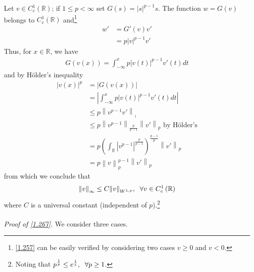\documentclass[a4paper,oneside]{book}
\numberwithin{equation}{chapter}
\begin{document}
Let $v\in C_c^1\left(\mathbb{R}\right)$; if $1\le p <\infty$ set $G\left( s \right) = {\left| s \right|^{p - 1}}s$. The function $w=G\left(v\right)$ belongs to $C_c^1\left(\mathbb{R}\right)$ and\footnote{\eqref{1.257} can be easily verified by considering two cases $v\ge 0$ and $v <0$.}
\begin{align}
w' &= G'\left( v \right)v'\\
 &= p{\left| v \right|^{p - 1}}v' \label{1.257}
\end{align}
Thus, for $x\in \mathbb{R}$, we have
\begin{align}
G\left( {v\left( x \right)} \right) = \int_{ - \infty }^x {p{{\left| {v\left( t \right)} \right|}^{p - 1}}v'\left( t \right)dt} 
\end{align}
and by H\"{o}lder's inequality
\begin{align}
\label{1.259}
{\left| {v\left( x \right)} \right|^p} &= \left| {G\left( {v\left( x \right)} \right)} \right|\\
& = \left| {\int_{ - \infty }^x {p{{\left| {v\left( t \right)} \right|}^{p - 1}}v'\left( t \right)dt} } \right|\\
& \le p{\left\| {{v^{p - 1}}v'} \right\|_{_1}}\\
& \le p{\left\| {{v^{p - 1}}} \right\|_{\frac{p}{{p - 1}}}}{\left\| {v'} \right\|_p}\mbox{ by H\"{o}lder's}\\
& = p{\left( {\int_{\mathbb{R}} {{{\left| {{v^{p - 1}}} \right|}^{\frac{p}{{p - 1}}}}} } \right)^{\frac{{p - 1}}{p}}}{\left\| {v'} \right\|_p}\\
& = p\left\| v \right\|_p^{p - 1}{\left\| {v'} \right\|_p} \label{1.264}
\end{align}
from which we conclude that
\begin{align}
\label{1.267}
{\left\| v \right\|_\infty } \le C{\left\| v \right\|_{{W^{1,p}}}},\hspace{0.2cm}\forall v \in C_c^1\left( \mathbb{R} \right)
\end{align}
where $C$ is a universal constant (independent of $p$).\footnote{Noting that ${p^{\frac{1}{p}}} \le {e^{\frac{1}{e}}},\hspace{0.2cm}\forall p \ge 1$.}\\
\\ 
\textit{Proof of \eqref{1.267}.} We consider three cases.
\end{document}
